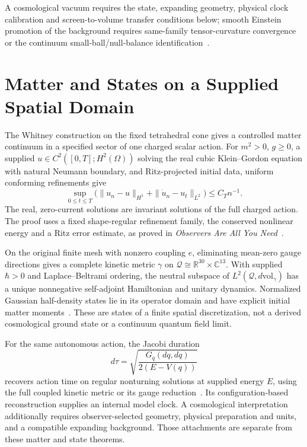 \documentclass[11pt]{article}
\theoremstyle{remark}
\theoremstyle{plain}
\begin{document}
A cosmological vacuum requires the state, expanding geometry, physical
clock calibration and screen-to-volume transfer conditions below; smooth
Einstein promotion of the background requires same-family tensor-curvature
convergence or the continuum small-ball/null-balance
identification~\cite{ophEinstein}.

\section{Matter and States on a Supplied Spatial Domain}

The Whitney construction on the fixed tetrahedral cone gives a controlled
matter continuum in a specified sector of one charged scalar action. For
\(m^2>0\), \(g\geq0\), a supplied
\(u\in C^2([0,T];H^2(\Omega))\) solving the real cubic Klein--Gordon
equation with natural Neumann boundary, and Ritz-projected initial data,
uniform conforming refinements give
\[
 \sup_{0\leq t\leq T}
 \bigl(\|u_n-u\|_{H^1}+\|\dot u_n-u_t\|_{L^2}\bigr)
 \leq C_T n^{-1}.
\]
The real, zero-current solutions are invariant solutions of the full
charged action. The proof uses a fixed shape-regular refinement family,
the conserved nonlinear energy and a Ritz error estimate, as proved in
\emph{Observers Are All You Need}~\cite{ophobservers}.

On the original finite mesh with nonzero coupling \(e\), eliminating
mean-zero gauge directions gives a
complete kinetic metric \(\gamma\) on
\(\mathcal Q\cong\mathbb R^{30}\times\mathbb C^{13}\). With supplied
\(\hbar>0\) and Laplace--Beltrami ordering, the neutral subspace of
\(L^2(\mathcal Q,d\mathrm{vol}_\gamma)\) has a unique nonnegative
self-adjoint Hamiltonian and unitary dynamics. Normalized Gaussian
half-density states lie in its operator domain and have explicit initial
matter moments~\cite{ophobservers}. These
are states of a finite spatial discretization, not a derived cosmological
ground state or a continuum quantum field limit.

For the same autonomous action, the Jacobi duration
\[
 d\tau=\sqrt{\frac{G_q(dq,dq)}{2(E-V(q))}}
\]
recovers action time on regular nonturning solutions at supplied energy
\(E\), using the full coupled kinetic metric or its gauge
reduction~\cite{ophobservers}. Its
configuration-based reconstruction supplies an internal model clock.
A cosmological interpretation additionally requires observer-selected
geometry, physical preparation and units, and a compatible expanding
background. Those attachments are separate from these matter and state
theorems.
\end{document}
